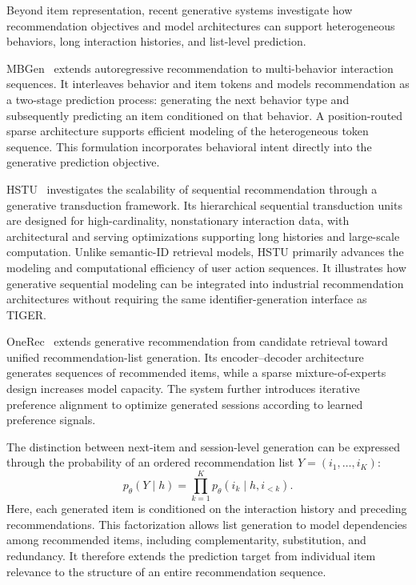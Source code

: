 \documentclass[sigconf,nonacm]{acmart}
\begin{document}
Beyond item representation, recent generative
systems investigate how recommendation objectives
and model architectures can support heterogeneous
behaviors, long interaction histories, and
list-level prediction.

MBGen~\cite{mbgen} extends autoregressive
recommendation to multi-behavior interaction
sequences. It interleaves behavior and item tokens
and models recommendation as a two-stage prediction
process: generating the next behavior type and
subsequently predicting an item conditioned on
that behavior. A position-routed sparse architecture
supports efficient modeling of the heterogeneous
token sequence. This formulation incorporates
behavioral intent directly into the generative
prediction objective.

HSTU~\cite{hstu} investigates the scalability
of sequential recommendation through a
generative transduction framework. Its hierarchical
sequential transduction units are designed for
high-cardinality, nonstationary interaction data,
with architectural and serving optimizations
supporting long histories and large-scale
computation. Unlike semantic-ID retrieval models,
HSTU primarily advances the modeling and
computational efficiency of user action sequences.
It illustrates how generative sequential modeling
can be integrated into industrial recommendation
architectures without requiring the same
identifier-generation interface as TIGER.

OneRec~\cite{onerec} extends generative
recommendation from candidate retrieval toward
unified recommendation-list generation. Its
encoder--decoder architecture generates sequences
of recommended items, while a sparse
mixture-of-experts design increases model capacity.
The system further introduces iterative preference
alignment to optimize generated sessions according
to learned preference signals.

The distinction between next-item and session-level
generation can be expressed through the probability
of an ordered recommendation list
$Y=(i_1,\ldots,i_K)$:
\begin{equation}
    p_\theta(Y\mid h)
    =
    \prod_{k=1}^{K}
    p_\theta(i_k\mid h,i_{<k}).
    \label{eq:session_generation}
\end{equation}
Here, each generated item is conditioned on the
interaction history and preceding recommendations.
This factorization allows list generation to model
dependencies among recommended items, including
complementarity, substitution, and redundancy.
It therefore extends the prediction target
from individual item relevance to the structure
of an entire recommendation sequence.
\end{document}
